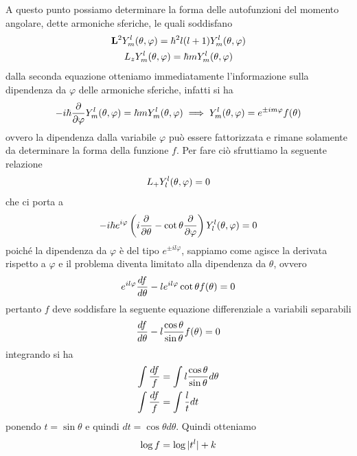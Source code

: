\documentclass{article}
\begin{document}
A questo punto possiamo determinare la forma delle autofunzioni del momento angolare, dette armoniche sferiche, le quali soddisfano
\begin{gather}
    \mathbf{L}^2Y^l_m(\theta, \varphi) = \hbar^2l(l+1)Y^l_m(\theta, \varphi) \notag \\
    L_zY^l_m(\theta, \varphi) = \hbar mY^l_m(\theta, \varphi) \notag 
\end{gather}
dalla seconda equazione otteniamo immediatamente l'informazione sulla dipendenza da $\varphi$ delle armoniche sferiche, infatti si ha
\begin{gather}
    -i\hbar\frac{\partial}{\partial \varphi}Y^l_m(\theta, \varphi) = \hbar mY^l_m(\theta, \varphi) \implies Y^l_m(\theta, \varphi) = e^{\pm im\varphi}f(\theta) \notag
\end{gather}
ovvero la dipendenza dalla variabile $\varphi$ può essere fattorizzata e rimane solamente da determinare la forma della funzione $f$. Per fare ciò sfruttiamo la seguente relazione
\begin{gather}
    L_+Y^l_l(\theta, \varphi) = 0 \notag
\end{gather}
che ci porta a
\begin{gather}
    -i\hbar e^{i\varphi}\left( i\frac{\partial}{\partial \theta} - \cot \theta \frac{\partial}{\partial \varphi} \right)Y^l_l(\theta, \varphi) = 0 \notag
\end{gather}
poiché la dipendenza da $\varphi$ è del tipo $e^{\pm il\varphi}$, sappiamo come agisce la derivata rispetto a $\varphi$ e il problema diventa limitato alla dipendenza da $\theta$, ovvero
\begin{gather}
    e^{il\varphi}\frac{df}{d\theta} - le^{il\varphi}\cot \theta f(\theta) = 0 \notag
\end{gather}
pertanto $f$ deve soddisfare la seguente equazione differenziale a variabili separabili
\begin{gather}
    \frac{df}{d\theta} -l\frac{\cos \theta}{\sin \theta} f(\theta) = 0 \notag
\end{gather}
integrando si ha
\begin{align}
    \int \frac{df}{f} &= \int l\frac{\cos\theta}{\sin\theta}d\theta \notag \\
    \int \frac{df}{f} &= \int \frac{l}{t}dt \notag
\end{align}
ponendo $t = \sin\theta$ e quindi $dt = \cos\theta d\theta$. Quindi otteniamo
\begin{gather}
    \log f = \log |t^l| + k \notag
\end{gather}
\end{document}
